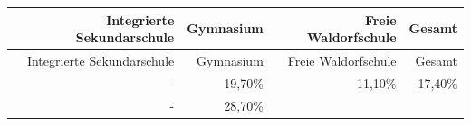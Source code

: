 \documentclass[a4paper,
fontsize=11pt,
oneside,
numbers=noperiodatend,
parskip=half-,
bibliography=totoc,
final
]{scrartcl}
\begin{document}
\begin{longtable}[]{@{}rrrr@{}}
\toprule
\begin{minipage}[b]{0.36\columnwidth}\raggedleft\strut
Integrierte Sekundarschule\strut
\end{minipage} & \begin{minipage}[b]{0.15\columnwidth}\raggedleft\strut
Gymnasium\strut
\end{minipage} & \begin{minipage}[b]{0.27\columnwidth}\raggedleft\strut
Freie Waldorfschule\strut
\end{minipage} & \begin{minipage}[b]{0.10\columnwidth}\raggedleft\strut
Gesamt\strut
\end{minipage}\tabularnewline
\midrule
\endfirsthead
\toprule
\begin{minipage}[b]{0.36\columnwidth}\raggedleft\strut
Integrierte Sekundarschule\strut
\end{minipage} & \begin{minipage}[b]{0.15\columnwidth}\raggedleft\strut
Gymnasium\strut
\end{minipage} & \begin{minipage}[b]{0.27\columnwidth}\raggedleft\strut
Freie Waldorfschule\strut
\end{minipage} & \begin{minipage}[b]{0.10\columnwidth}\raggedleft\strut
Gesamt\strut
\end{minipage}\tabularnewline
\midrule
\endhead
\begin{minipage}[t]{0.36\columnwidth}\raggedleft\strut
-\strut
\end{minipage} & \begin{minipage}[t]{0.15\columnwidth}\raggedleft\strut
19,70\%\strut
\end{minipage} & \begin{minipage}[t]{0.27\columnwidth}\raggedleft\strut
11,10\%\strut
\end{minipage} & \begin{minipage}[t]{0.10\columnwidth}\raggedleft\strut
17,40\%\strut
\end{minipage}\tabularnewline
\begin{minipage}[t]{0.36\columnwidth}\raggedleft\strut
-\strut
\end{minipage} & \begin{minipage}[t]{0.15\columnwidth}\raggedleft\strut
28,70\%\strut
\end{minipage} & \begin{minipage}[t]{0.27\columnwidth}\raggedleft\strut

\end{minipage}
\end{longtable}
\end{document}
